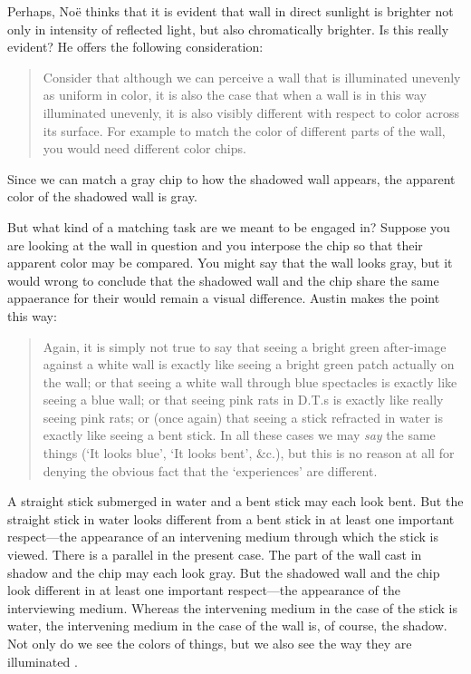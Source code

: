 \documentclass[12pt]{article}
\begin{document}
Perhaps, Noë thinks that it is evident that wall in direct sunlight is brighter not only in intensity of reflected light, but also chromatically brighter. Is this really evident? He offers the following consideration:
	\begin{quote}
		Consider that although we can perceive a wall that is illuminated unevenly as uniform in color, it is also the case that when a wall is in this way illuminated unevenly, it is also visibly different with respect to color across its surface. For example to match the color of different parts of the wall, you would need different color chips. \citep[128]{Noe:2004fk}
	\end{quote}
Since we can match a gray chip to how the shadowed wall appears, the apparent color of the shadowed wall is gray. 

But what kind of a matching task are we meant to be engaged in? Suppose you are looking at the wall in question and you interpose the chip so that their apparent color may be compared. You might say that the wall looks gray, but it would wrong to conclude that the shadowed wall and the chip share the same appaerance for their would remain a visual difference. Austin makes the point this way:
	\begin{quote}
		Again, it is simply not true to say that seeing a bright green after-image against a white wall is exactly like seeing a bright green patch actually on the wall; or that seeing a white wall through blue spectacles is exactly like seeing a blue wall; or that seeing pink rats in D.T.s is exactly like really seeing pink rats; or (once again) that seeing a stick refracted in water is exactly like seeing a bent stick. In all these cases we may \emph{say} the same things (`It looks blue', `It looks bent', \&c.), but this is no reason at all for denying the obvious fact that the `experiences' are different. \citep[49]{Austin:1962lr}
	\end{quote}

A straight stick submerged in water and a bent stick may each look bent. But the straight stick in water looks different from a bent stick in at least one important respect---the appearance of an intervening medium through which the stick is viewed. There is a parallel in the present case. The part of the wall cast in shadow and the chip may each look gray. But the shadowed wall and the chip look different in at least one important respect---the appearance of the interviewing medium. Whereas the intervening medium in the case of the stick is water, the intervening medium in the case of the wall is, of course, the shadow. Not only do we see the colors of things, but we also see the way they are illuminated \citep[see][]{Hilbert:2007qy}.
\end{document}
